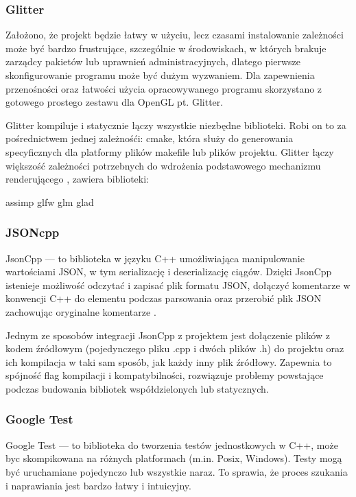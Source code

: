 \subsubsection{Glitter}
Założono, że projekt będzie łatwy w użyciu, lecz czasami instalowanie zależności może być bardzo frustrujące, szczególnie w środowiskach, w których brakuje zarządcy pakietów lub uprawnień administracyjnych, dlatego pierwsze skonfigurowanie programu może być dużym wyzwaniem.
Dla zapewnienia przenośności oraz łatwości użycia opracowywanego programu skorzystano z gotowego prostego zestawu dla OpenGL pt. Glitter.

Glitter kompiluje i statycznie łączy wszystkie niezbędne biblioteki. Robi on to za pośrednictwem jednej zależnośći: cmake, która służy do generowania specyficznych dla platformy plików makefile lub plików projektu. Glitter łączy większość zależności potrzebnych do wdrożenia podstawowego mechanizmu renderującego \cite{glitter}, zawiera biblioteki:
\begin{itemize}
\itemi assimp
\itemi glfw
\itemi glm
\itemi glad
\end{itemize}

\subsubsection{JSONcpp}
JsonCpp --- to biblioteka w języku C++ umożliwiająca manipulowanie wartościami JSON, w tym serializację i deserializację ciągów. Dzięki JsonCpp istenieje możliwość odczytać i zapisać plik formatu JSON, dołączyć komentarze w konwencji C++ do elementu podczas parsowania oraz przerobić plik JSON zachowując oryginalne komentarze \cite{jsoncpp}.

Jednym ze sposobów integracji JsonCpp z projektem jest dołączenie plików z kodem źródłowym (pojedynczego pliku .cpp i dwóch plików .h) do projektu oraz ich kompilacja w taki sam sposób, jak każdy inny plik źródłowy. Zapewnia to spójność flag kompilacji i kompatybilności, rozwiązuje problemy powstające podczas budowania bibliotek współdzielonych lub statycznych. 

\subsubsection{Google Test}
Google Test --- to biblioteka do tworzenia testów jednostkowych w C++, może byc skompikowana na różnych platformach (m.in. Posix, Windows). Testy mogą być uruchamiane pojedynczo lub wszystkie naraz. To sprawia, że proces szukania i naprawiania jest bardzo łatwy i intuicyjny\cite{googleTest}.

